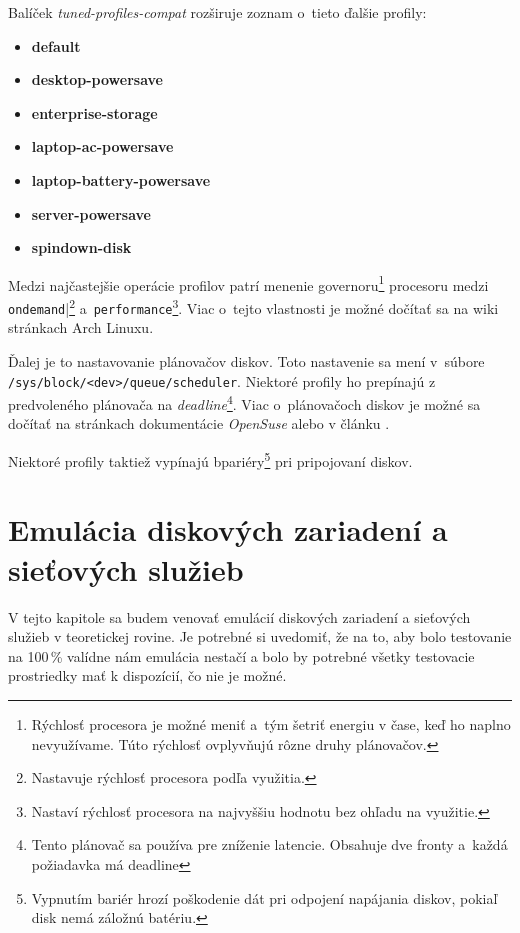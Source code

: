 Balíček \emph{tuned-profiles-compat} rozširuje zoznam o~tieto ďalšie profily:

\begin{itemize}
    \item \textbf{default}
    \item \textbf{desktop-powersave}
    \item \textbf{enterprise-storage}
    \item \textbf{laptop-ac-powersave}
    \item \textbf{laptop-battery-powersave}
    \item \textbf{server-powersave}
    \item \textbf{spindown-disk}
\end{itemize}

Medzi najčastejšie operácie profilov patrí menenie governoru\footnote{Rýchlosť
procesora je možné meniť a~tým šetriť energiu v čase, keď ho naplno
nevyužívame. Túto rýchlosť ovplyvňujú rôzne druhy plánovačov.} procesoru medzi
\texttt{ondemand}|\footnote{Nastavuje rýchlosť procesora podľa využitia.}
a~\texttt{performance}\footnote{Nastaví rýchlosť procesora na najvyššiu hodnotu
bez ohľadu na využitie.}. Viac o~tejto vlastnosti je možné dočítať sa na wiki
stránkach Arch Linuxu\cite{arch:governor}.

Ďalej je to nastavovanie plánovačov diskov. Toto nastavenie sa mení v~súbore
\texttt{/sys\-/block\-/<dev>\-/queue\-/scheduler}. Niektoré profily ho prepínajú z
predvoleného plánovača na \emph{deadline}\footnote{Tento plánovač sa používa
pre zníženie latencie. Obsahuje dve fronty a~každá požiadavka má deadline}.
Viac o~plánovačoch diskov je možné sa dočítať na stránkach dokumentácie
\emph{OpenSuse}\cite{suse:scheduler} alebo v článku \cite{book:scheduler}.

Niektoré profily taktiež vypínajú bpariéry\footnote{Vypnutím bariér hrozí
poškodenie dát pri odpojení napájania diskov, pokiaľ disk nemá záložnú
batériu.} pri pripojovaní diskov. 

%
%

\chapter{Emulácia diskových zariadení a sieťových služieb}

V tejto kapitole sa budem venovať emulácií diskových zariadení a sieťových
služieb v teoretickej rovine. Je potrebné si uvedomiť, že na to, aby bolo
testovanie na 100\,\% valídne nám emulácia nestačí a bolo by potrebné všetky
testovacie prostriedky mať k dispozícií, čo nie je možné.

